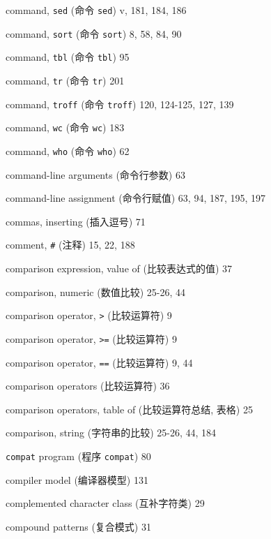 \begin{multicols}{2}
\hangindent=2pc  command, \verb'sed' (命令 \verb'sed') 
v, 181, 184, 186

\hangindent=2pc  command, \verb'sort' (命令 \verb'sort') 8, 58, 84, 90

\hangindent=2pc  command, \verb'tbl' (命令 \verb'tbl') 95

\hangindent=2pc  command, \verb'tr' (命令 \verb'tr') 201

\hangindent=2pc  command, \verb'troff' (命令 \verb'troff')
120, 124-125, 127, 139

\hangindent=2pc  command, \verb'wc' (命令 \verb'wc') 183


\hangindent=2pc  command, \verb'who' (命令 \verb'who') 62

\hangindent=2pc  command-line arguments (命令行参数) 63

\hangindent=2pc  command-line assignment (命令行赋值)
63, 94, 187, 195, 197

\hangindent=2pc  commas, inserting (插入逗号) 71

\hangindent=2pc  comment, \verb'#' (注释) 15, 22, 188

\hangindent=2pc  comparison expression, value of
(比较表达式的值) 37

\hangindent=2pc  comparison, numeric (数值比较) 25-26, 44

\hangindent=2pc  comparison operator, \verb'>' (比较运算符) 9

\hangindent=2pc  comparison operator, \verb'>=' (比较运算符) 9

\hangindent=2pc  comparison operator, \verb'==' (比较运算符) 9, 44

\hangindent=2pc  comparison operators (比较运算符) 36

\hangindent=2pc  comparison operators, table of (比较运算符总结,
 表格) 25

\hangindent=2pc  comparison, string (字符串的比较) 25-26, 44, 184

\hangindent=2pc  \verb'compat' program (程序 \verb'compat') 80

\hangindent=2pc  compiler model (编译器模型) 131

\hangindent=2pc  complemented character class (互补字符类) 29

\hangindent=2pc  compound patterns (复合模式) 31


\end{multicols}
